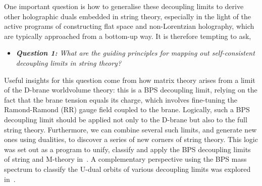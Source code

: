 \documentclass[11pt]{article}
\renewcommand{\emph}[1]{\textit{#1}}
\begin{document}
One important question is how to generalise these decoupling limits to derive other holographic duals embedded in string theory, especially in the light of the active programs of constructing flat space and non-Lorentzian holography, which are typically approached from a bottom-up way. It is therefore tempting to ask,
%
\begin{itemize}

\item

\emph{\textbf{Question 1:} What are the guiding principles for mapping out self-consistent decoupling limits in string theory?}

\end{itemize}
%
Useful insights for this question come from how matrix theory arises from a limit of the D-brane worldvolume theory: this is a BPS decoupling limit, relying on the fact that the brane tension equals its charge, which involves fine-tuning the Ramond-Ramond (RR) gauge field coupled to the brane. Logically, such a BPS decoupling limit should be applied not only to the D-brane but also to the full string theory. 
Furthermore, we can combine several such limits, and generate new ones using dualities, to discover a series of new corners of string theory.
This logic was set out as a program to unify, classify and apply the BPS decoupling limits of string and M-theory in~\cite{Blair:2023noj, Gomis:2023eav}. A complementary perspective using the BPS mass spectrum to classify the U-dual orbits of various decoupling limits was explored in~\cite{bpslimits}.
\end{document}
